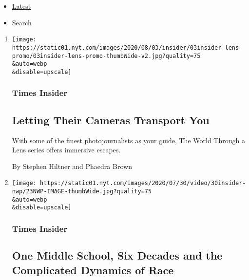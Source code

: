 \begin{itemize}
\tightlist
\item
  \protect\hyperlink{stream-panel}{Latest}
\item
  Search
\end{itemize}

\begin{enumerate}
\def\labelenumi{\arabic{enumi}.}
\item
  \href{/2020/08/03/insider/letting-their-cameras-transport-you.html}{}

  \texttt{[image: https://static01.nyt.com/images/2020/08/03/insider/03insider-lens-promo/03insider-lens-promo-thumbWide-v2.jpg?quality=75\\\&auto=webp\\\&disable=upscale]}

  \hypertarget{times-insider-2}{%
  \subsubsection{Times Insider}\label{times-insider-2}}

  \hypertarget{letting-their-cameras-transport-you}{%
  \subsection{Letting Their Cameras Transport
  You}\label{letting-their-cameras-transport-you}}

  With some of the finest photojournalists as your guide, The World
  Through a Lens series offers immersive escapes.

  By Stephen Hiltner and Phaedra Brown
\item
  \href{/2020/07/30/insider/nice-white-parents.html}{}

  \texttt{[image: https://static01.nyt.com/images/2020/07/30/video/30insider-nwp/23NWP-IMAGE-thumbWide.jpg?quality=75\\\&auto=webp\\\&disable=upscale]}

  \hypertarget{times-insider-3}{%
  \subsubsection{Times Insider}\label{times-insider-3}}

  \hypertarget{one-middle-school-six-decades-and-the-complicated-dynamics-of-race}{%
  \subsection{One Middle School, Six Decades and the Complicated
  Dynamics of
  Race}\label{one-middle-school-six-decades-and-the-complicated-dynamics-of-race}}


\end{enumerate}
